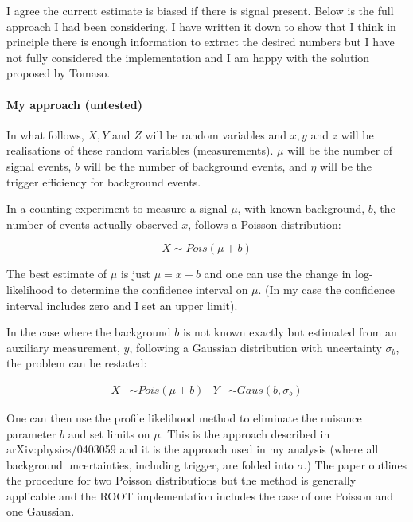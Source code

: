 \documentclass[12pt]{report}
\begin{document}
I agree the current estimate is biased if there is signal present.
Below is the full approach I had been considering. 
I have written it down to show that I think in principle there is enough information 
to extract the desired numbers but I have not fully considered the implementation 
and I am happy with the solution proposed by Tomaso.

\paragraphfont{\color{black}}  %
\paragraph{My approach (untested)\\}

In what follows, $X, Y$ and $Z$ will be random variables and $x, y$ and $z$ 
will be realisations of these random variables (measurements).
$\mu$ will be the number of signal events, $b$ will be the number of background events,
and $\eta$ will be the trigger efficiency for background events.

In a counting experiment to measure a signal $\mu$, with known background, $b$, 
the number of events actually observed $x$, follows a Poisson distribution:

\begin{equation}
    X \sim Pois( \mu + b )
\end{equation}

The best estimate of $\mu$ is just $\mu = x - b$
and one can use the change in log-likelihood to determine the confidence interval on $\mu$.
(In my case the confidence interval includes zero and I set an upper limit).

In the case where the background $b$ is not known exactly but estimated from an auxiliary measurement, $y$, following a Gaussian distribution with uncertainty $\sigma_b$, the problem can be restated:

\begin{align}
    X &\sim Pois( \mu + b ) & Y & \sim Gaus( b, \sigma_b)
\end{align}

One can then use the profile likelihood method to eliminate the nuisance parameter $b$ and set limits on $\mu$.
This is the approach described in arXiv:physics/0403059 and it is the approach used in my analysis
(where all background uncertainties, including trigger, are folded into $\sigma$.)
The paper outlines the procedure for two Poisson distributions but the method is generally applicable
and the ROOT implementation includes the case of one Poisson and one Gaussian.
\end{document}
